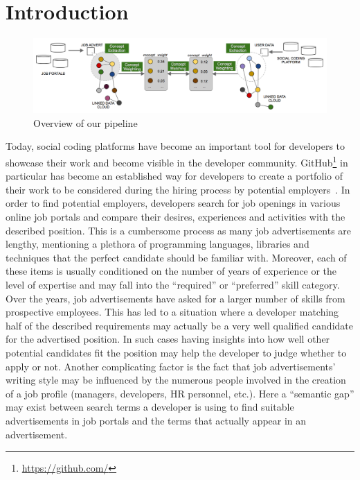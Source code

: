 \documentclass[conference]{IEEEtran}
\begin{document}
\section{Introduction}

\begin{figure}[!htb]
\centering
\includegraphics[scale=0.35]{images/pipeline.png}
\caption{Overview of our pipeline}
\label{fig:pipeline}
\end{figure}

Today, social coding platforms have become an important tool for developers to showcase their work and become visible in the developer community. GitHub\footnote{\url{https://github.com/}} in particular has become an established way for developers to create a portfolio of their work to be considered during the hiring process by potential employers~\cite{dabbish2012social}. In order to find potential employers, developers search for job openings in various online job portals and compare their desires, experiences and activities with the described position. This is a cumbersome process as many job advertisements are lengthy, mentioning a plethora of programming languages, libraries and techniques that the perfect candidate should be familiar with.  Moreover, each of these items is usually conditioned on the number of years of experience or the level of expertise and may fall into the ``required'' or ``preferred'' skill category. Over the years, job advertisements have asked for a larger number of skills from prospective employees. This has led to a situation where a developer matching half of the described requirements may actually be a very well qualified candidate for the advertised position. In such cases having insights into how well other potential candidates fit the position may help the developer to judge whether to apply or not. Another complicating factor is the fact that job advertisements' writing style may be influenced by the numerous people involved in the creation of a job profile (managers, developers, HR personnel, etc.). Here a ``semantic gap'' may exist between search terms a developer is using to find suitable advertisements in job portals and the terms that actually appear in an advertisement. 
\end{document}
